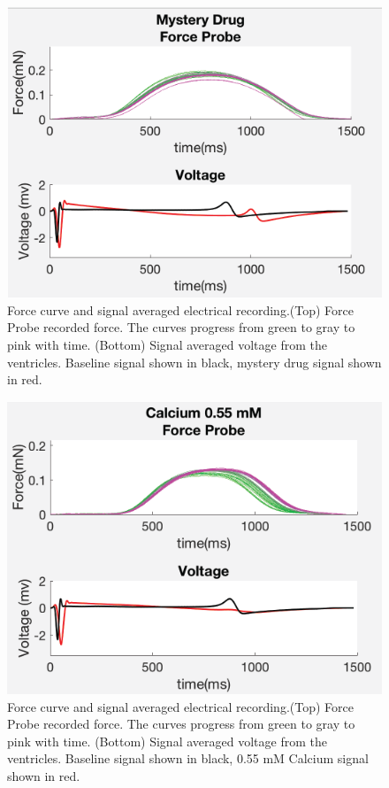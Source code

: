 \documentclass[12pt]{article}
\begin{document}
\begin{figure}[H]
	\label{fig:Drugx}
	\centering
	\includegraphics[width = .95\textwidth]{Figures/Drugx.png}
	\caption{Force curve and signal averaged electrical recording.(Top) Force Probe recorded force. The curves progress from green to gray to pink with time. (Bottom) Signal averaged voltage from the ventricles. Baseline signal shown in black, mystery drug signal shown in red. }
\end{figure}
\begin{figure}[H]
	\label{fig:CalcLow}
	\centering
	\includegraphics[width = .95\textwidth]{Figures/CalciumLow.png}
	\caption{Force curve and signal averaged electrical recording.(Top) Force Probe recorded force. The curves progress from green to gray to pink with time. (Bottom) Signal averaged voltage from the ventricles. Baseline signal shown in black, 0.55 mM Calcium signal shown in red. }
\end{figure}
\end{document}
